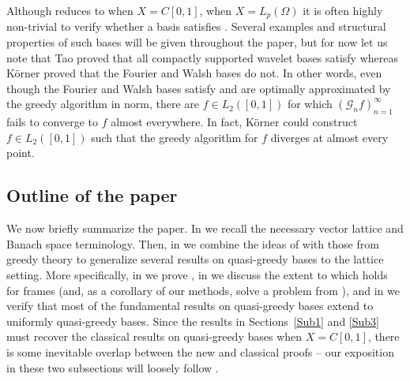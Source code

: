 \documentclass[12pt,leqno]{amsart}
\numberwithin{equation}{section}
\theoremstyle{definition}
\begin{document}
Although   reduces to  when $X=C[0,1]$, when $X=L_p(\Omega)$ it is  often highly non-trivial to verify whether a  basis satisfies . Several examples and structural properties of such bases will be given throughout the paper, but for now let us note that Tao \cite{Tao96} proved that all compactly supported wavelet bases  satisfy   whereas  K\"orner \cite{K96, K06} proved that the Fourier and Walsh bases do not. In other words,  even though the Fourier and Walsh bases satisfy  and are optimally approximated  by the greedy algorithm in norm, there are $f\in L_2([0,1])$  for which $(\mathcal{G}_nf)_{n=1}^\infty$ fails to converge to $f$ almost everywhere. In fact, K\"orner could construct $f\in L_2([0,1])$ such that the greedy algorithm for $f$ diverges at almost every point.
\subsection{Outline of the paper}
We now briefly summarize  the paper.  In  we recall the necessary vector lattice and Banach space terminology. Then, in  we combine the ideas of \cite{T,TT19} with those from greedy theory to generalize several results on quasi-greedy bases to the lattice setting. More specifically, in  we prove  , in  we discuss the extent to which  holds for frames (and, as a corollary of our methods, solve a problem from \cite{hart2023overcomplete}), and in  we  verify that most of the fundamental results on quasi-greedy bases extend to uniformly quasi-greedy bases. Since the results in Sections~\ref{Sub1} and \ref{Sub3} must recover the classical results on quasi-greedy bases when $X=C[0,1]$,  there is some inevitable overlap between the new and classical proofs -- our exposition in these two subsections will loosely follow  \cite[Chapter 10]{AK16}. 
\medskip


\end{document}
